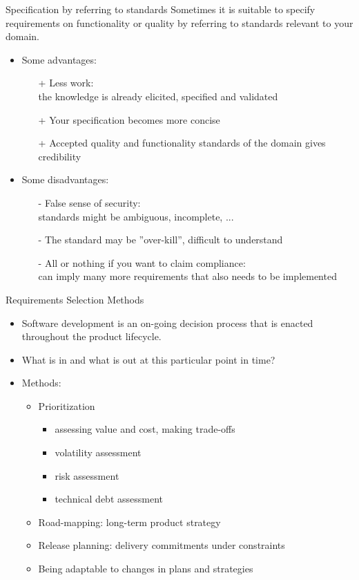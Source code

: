 \documentclass{simpleslides}
\begin{document}
\begin{frame}[fragile]{Specification by referring to standards}
Sometimes it is suitable to specify requirements on functionality or quality by referring to standards relevant to your domain.
\begin{itemize}
\item Some advantages:
\begin{itemize}
\item [+] Less work:\\the knowledge is already elicited, specified and validated
\item [+] Your specification becomes more concise
\item [+] Accepted quality and functionality standards of the domain gives credibility
\end{itemize}
\item Some disadvantages:
\begin{itemize}
\item [-] False sense of security:\\ standards might be ambiguous, incomplete, ...
\item [-] The standard may be ''over-kill'', difficult to understand
\item [-] All or nothing if you want to claim compliance:\\can imply many more requirements that also needs to be implemented
\end{itemize}
\end{itemize}
\end{frame}

\begin{frame}[fragile]{Requirements Selection Methods}
\begin{itemize}
\item Software development is an on-going decision process that is enacted throughout the product lifecycle.
\item What is in and what is out at this particular point in time?
\item Methods:
\begin{itemize}
  \item Prioritization
  \begin{itemize}
\item assessing value and cost, making trade-offs
\item volatility assessment
\item risk assessment
\item technical debt assessment
\end{itemize}
\item Road-mapping: long-term product strategy 
\item Release planning: delivery commitments under constraints
\item Being adaptable to changes in plans and strategies
\end{itemize}
\end{itemize}
\end{frame}
\end{document}
